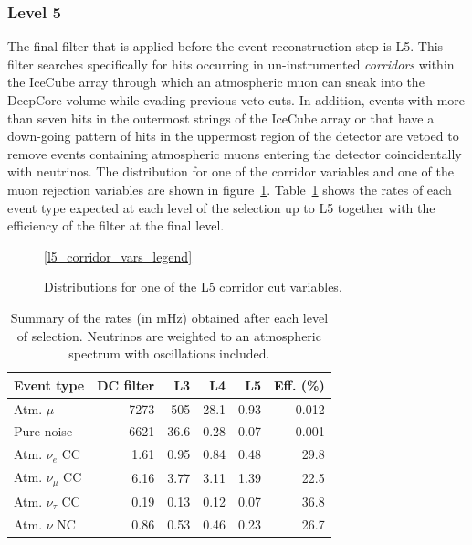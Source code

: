 \subsubsection{Level 5}
The final filter that is applied before the event reconstruction step is L5. This filter searches specifically for hits occurring in un-instrumented \emph{corridors} within the IceCube array through which an atmospheric muon can sneak into the DeepCore volume while evading previous veto cuts. In addition, events with more than seven hits in the outermost strings of the IceCube array or that have a down-going pattern of hits in the uppermost region of the detector are vetoed to remove events containing atmospheric muons entering the detector coincidentally with neutrinos. The distribution for one of the corridor variables and one of the muon rejection variables are shown in figure~\ref{fig:l5-vars}. Table~\ref{tab:l5_summary} shows the rates of each event type expected at each level of the selection up to L5 together with the efficiency of the filter at the final level.
\begin{figure}
    \centering
    \ref{l5_corridor_vars_legend}
    
    
    \caption{Distributions for one of the L5 corridor cut variables.}
    \label{fig:l5-vars}
\end{figure}

\begin{table}
\begin{tabular}{lrrrrr}
Event type  & DC filter   & L3   & L4   & L5   & Eff. (\%) \\
\toprule
Atm. $\mu$         & 7273 & 505  & 28.1 & 0.93 & 0.012          \\
Pure noise         & 6621 & 36.6 & 0.28 & 0.07 & 0.001          \\
Atm. $\nu_e$ CC    & 1.61 & 0.95 & 0.84 & 0.48 & 29.8           \\
Atm. $\nu_\mu$ CC  & 6.16 & 3.77 & 3.11 & 1.39 & 22.5           \\
Atm. $\nu_\tau$ CC & 0.19 & 0.13 & 0.12 & 0.07 & 36.8           \\
Atm. $\nu$ NC      & 0.86 & 0.53 & 0.46 & 0.23 & 26.7  \\
\end{tabular}
\caption{Summary of the rates (in mHz) obtained after each level of selection. Neutrinos are weighted to an atmospheric spectrum with oscillations included.}
\label{tab:l5_summary}
\end{table}

